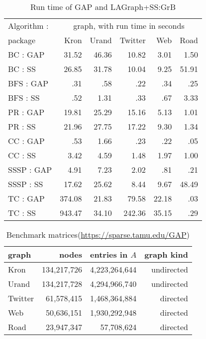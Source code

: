 \begin{table}
\begin{center}
\begin{tabular}{|l|rrrrr|}
\hline
Algorithm :    &   \multicolumn{5}{c|}{graph, with run time in seconds}  \\
 package       &   Kron    &   Urand   &   Twitter  &  Web    &    Road  \\
\hline
BC   : GAP     &  31.52    &  46.36    &  10.82     &  3.01   &    1.50  \\
BC   : SS      &  26.85    &  31.78    &  10.04     &  9.25   &   51.91  \\
\hline
BFS  : GAP     &    .31    &    .58    &    .22     &   .34   &     .25  \\
BFS  : SS      &    .52    &   1.31    &    .33     &   .67   &    3.33  \\
\hline
PR   : GAP     &  19.81    &  25.29    &  15.16     &  5.13   &    1.01  \\
PR   : SS      &  21.96    &  27.75    &  17.22     &  9.30   &    1.34  \\
\hline
CC   : GAP     &    .53    &   1.66    &    .23     &   .22   &     .05  \\
CC   : SS      &   3.42    &   4.59    &   1.48     &  1.97   &    1.00  \\
\hline
SSSP : GAP     &   4.91    &   7.23    &   2.02     &   .81   &     .21  \\
SSSP : SS      &  17.62    &  25.62    &   8.44     &  9.67   &   48.49  \\
\hline
TC   : GAP     & 374.08    &  21.83    &  79.58     & 22.18   &     .03  \\
TC   : SS      & 943.47    &  34.10    & 242.36     & 35.15   &     .29  \\
\hline
\end{tabular}
\caption{Run time of GAP and LAGraph+SS:GrB
\label{table:results}}
\end{center}
\end{table}

\begin{table}
\begin{center}
\begin{tabular}{|l|rrr|}
\hline
graph   & nodes        & entries in $A$ & graph kind \\
\hline
Kron    & 134,217,726 &  4,223,264,644 &  undirected   \\
Urand   & 134,217,728 &  4,294,966,740 &  undirected   \\
Twitter &  61,578,415 &  1,468,364,884 &  directed     \\
Web     &  50,636,151 &  1,930,292,948 &  directed     \\
Road    &  23,947,347 &     57,708,624 &  directed     \\
\hline
\end{tabular}
\caption{Benchmark matrices\label{table:matrices}
(\url{https://sparse.tamu.edu/GAP})}
\end{center}
\end{table}

